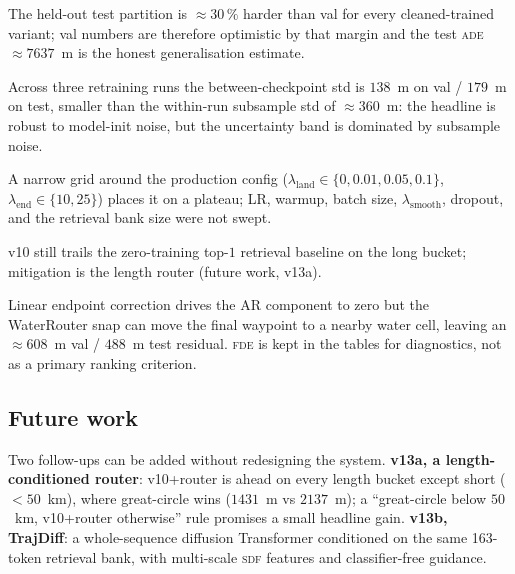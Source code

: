 \documentclass[oneside, a4paper, onecolumn, 11pt]{article}
\newcommand{\ade}{\textsc{ade}}
\newcommand{\fde}{\textsc{fde}}
\newcommand{\sdf}{\textsc{sdf}}
\begin{document}
\begin{description}[leftmargin=*,style=nextline]
  \item[Val-to-test optimism gap (Section~\ref{sec:valtest}).]
        The held-out test partition is $\approx 30\,\%$ harder than
        val for every cleaned-trained variant; val numbers are
        therefore optimistic by that margin and the test \ade{}
        $\approx 7637$~m is the honest generalisation estimate.
  \item[Training-seed variance is small but measured.]
        Across three retraining runs the between-checkpoint std is
        $138$~m on val / $179$~m on test, smaller than the within-run
        subsample std of $\approx 360$~m: the headline is robust to
        model-init noise, but the uncertainty band is dominated by
        subsample noise.
  \item[Hyperparameter search was minimal.]
        A narrow grid around the production config
        ($\lambda_{\mathrm{land}}\in\{0,0.01,0.05,0.1\}$,
        $\lambda_{\mathrm{end}}\in\{10,25\}$) places it on a
        plateau; LR, warmup, batch size, $\lambda_{\mathrm{smooth}}$,
        dropout, and the retrieval bank size were not swept.
  \item[Long routes ($>$500~km).]
        v10 still trails the zero-training top-$1$ retrieval baseline
        on the long bucket; mitigation is the length router (future
        work, v13a).
  \item[FDE is not zero.]
        Linear endpoint correction drives the AR component to zero
        but the WaterRouter snap can move the final waypoint to a
        nearby water cell, leaving an $\approx 608$~m val /
        $488$~m test residual.  \fde{} is kept in the tables for
        diagnostics, not as a primary ranking criterion.
\end{description}

\subsection{Future work}

Two follow-ups can be added without redesigning the system.
\textbf{v13a, a length-conditioned router}: v10+router is ahead on
every length bucket except short ($<\!50$~km), where great-circle
wins ($1431$~m vs $2137$~m); a ``great-circle below $50$~km,
v10+router otherwise'' rule promises a small headline gain.
\textbf{v13b, TrajDiff}: a whole-sequence diffusion Transformer
conditioned on the same 163-token retrieval bank, with multi-scale
\sdf{} features and classifier-free guidance.
\end{document}
